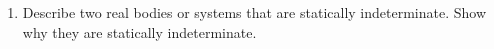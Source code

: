 \documentclass{tufte-handout}
\newcommand{\ee}{\end{enumerate}}
\begin{document}
\begin{enumerate}[resume]
 \vfill
 

\item Describe two real bodies or systems that are statically indeterminate.  Show why they are statically indeterminate. 

\vfill

\ee
\end{document}
